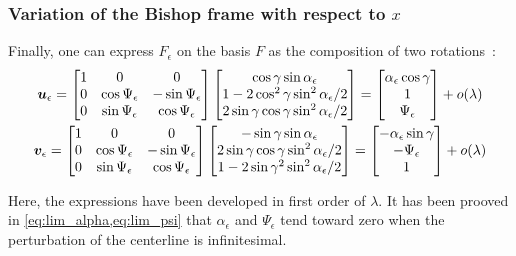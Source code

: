 \subsubsection{Variation of the Bishop frame with respect to $x$}
Finally, one can express $F_\epsilon$ on the basis $F$ as the composition of two rotations~:
\begin{subequations}
	\begin{gather}
	\boldsymbol{u}_\epsilon =
	\begin{bmatrix}
		1 & 0 & 0 \\
		0 & \cos{\Psi_\epsilon} & -\sin{\Psi_\epsilon} \\
		0 & \sin{\Psi_\epsilon} & \cos{\Psi_\epsilon}
	\end{bmatrix}
	\begin{bmatrix}
		\cos{\gamma}\sin{\alpha_\epsilon} \\
		1-2\cos^2{\gamma}\sin^2{\alpha_\epsilon/2} \\
		2\sin{\gamma}\cos{\gamma}\sin^2{\alpha_\epsilon/2}
	\end{bmatrix}
	=
	\begin{bmatrix}
		\alpha_\epsilon\cos{\gamma}\\
		1 \\
		\Psi_\epsilon
	\end{bmatrix}
	+ o(\lambda)
	\\
	\boldsymbol{v}_\epsilon =
	\begin{bmatrix}
		1 & 0 & 0 \\
		0 & \cos{\Psi_\epsilon} & -\sin{\Psi_\epsilon} \\
		0 & \sin{\Psi_\epsilon} & \cos{\Psi_\epsilon}
	\end{bmatrix}
	\begin{bmatrix}
		-\sin{\gamma}\sin{\alpha_\epsilon} \\
		2\sin{\gamma}\cos{\gamma}\sin^2{\alpha_\epsilon/2} \\
		1-2\sin{\gamma}^2\sin^2{\alpha_\epsilon/2}
	\end{bmatrix}
	=
	\begin{bmatrix}
		-\alpha_\epsilon\sin{\gamma}\\
		-\Psi_\epsilon \\
		1
	\end{bmatrix}
	+ o(\lambda)
	\end{gather}
\end{subequations}

%
Here, the expressions have been developed in first order of $\lambda$. It has been prooved in \cref{eq:lim_alpha,eq:lim_psi} that $\alpha_\epsilon$ and $\Psi_\epsilon$ tend toward zero when the perturbation of the centerline is infinitesimal.

